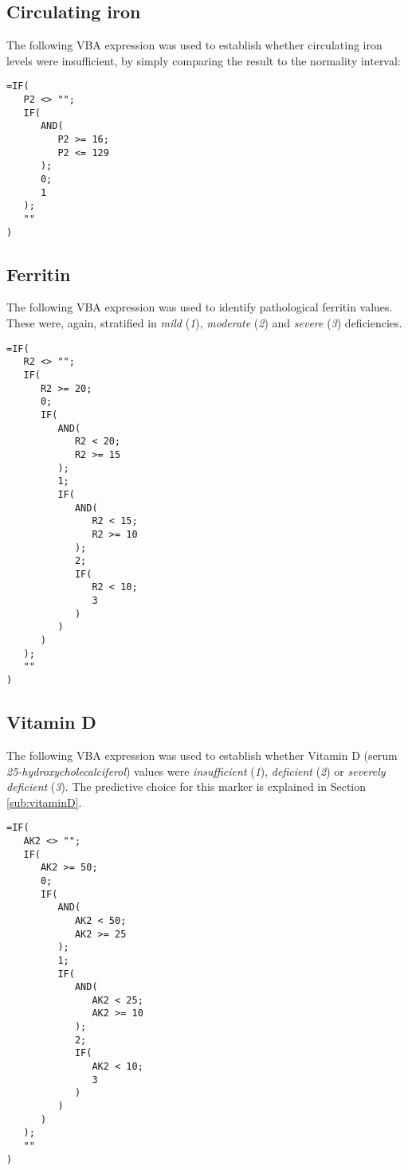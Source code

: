 \subsection{Circulating iron}\label{asub:patiron}
The following VBA expression was used to establish whether circulating iron levels were insufficient, by simply comparing the result to the normality interval:

\begin{minipage}{\linewidth}
\begin{lstlisting}
=IF(
   P2 <> "";
   IF(
      AND(
         P2 >= 16;
         P2 <= 129
      );
      0;
      1
   );
   ""
)
\end{lstlisting}
\end{minipage}

\subsection{Ferritin}\label{asub:patferritin}
The following VBA expression was used to identify pathological ferritin values. These were, again, stratified in \textit{mild} (\textit{1}), \textit{moderate} (\textit{2}) and \textit{severe} (\textit{3}) deficiencies.

\begin{lstlisting}
=IF(
   R2 <> "";
   IF(
      R2 >= 20;
      0;
      IF(
         AND(
            R2 < 20;
            R2 >= 15
         );
         1;
         IF(
            AND(
               R2 < 15;
               R2 >= 10
            );
            2;
            IF(
               R2 < 10;
               3
            )
         )
      )
   );
   ""
)
\end{lstlisting}

\subsection{Vitamin D}\label{asub:patvitaminD}
The following VBA expression was used to establish whether Vitamin D (serum \textit{25-hydroxycholecalciferol}) values were \textit{insufficient} (\textit{1}), \textit{deficient} (\textit{2}) or \textit{severely deficient} (\textit{3}). The predictive choice for this marker is explained in Section \ref{sub:vitaminD}.

\begin{lstlisting}
=IF(
   AK2 <> "";
   IF(
      AK2 >= 50;
      0;
      IF(
         AND(
            AK2 < 50;
            AK2 >= 25
         );
         1;
         IF(
            AND(
               AK2 < 25;
               AK2 >= 10
            );
            2;
            IF(
               AK2 < 10;
               3
            )
         )
      )
   );
   ""
)
\end{lstlisting}

